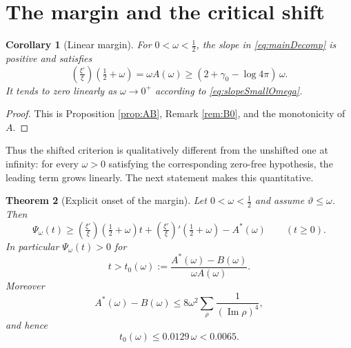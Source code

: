 \documentclass[11pt,reqno]{amsart}
\theoremstyle{plain}
\newtheorem{theorem}{Theorem}[section]
\newtheorem{corollary}[theorem]{Corollary}
\theoremstyle{definition}
\newcommand{\Ip}{\operatorname{Im}}
\newcommand{\lxi}[1]{\left(\tfrac{\xi'}{\xi}\right)\!#1}
\begin{document}
\section{The margin and the critical shift}\label{sec:margin}

\begin{corollary}[Linear margin]\label{cor:margin}
For $0<\omega<\tfrac12$, the slope in \eqref{eq:mainDecomp} is positive and satisfies
\begin{equation}\label{eq:slopeLower}
 \lxi{\left(\tfrac12+\omega\right)}
 =\omega A(\omega)
 \ge (2+\gamma_0-\log4\pi)\,\omega.
\end{equation}
It tends to zero linearly as $\omega\to0^+$ according to \eqref{eq:slopeSmallOmega}.
\end{corollary}

\begin{proof}
This is Proposition \ref{prop:AB}, Remark \ref{rem:B0}, and the monotonicity of $A$.
\end{proof}

Thus the shifted criterion is qualitatively different from the unshifted one at infinity: for every
$\omega>0$ satisfying the corresponding zero-free hypothesis, the leading term grows linearly.
The next statement makes this quantitative.

\begin{theorem}[Explicit onset of the margin]\label{thm:threshold}
Let $0<\omega<\tfrac12$ and assume $\vartheta\le\omega$.  Then
\begin{equation}\label{eq:lowerMargin}
 \Psi_\omega(t)\ge
 \lxi{\left(\tfrac12+\omega\right)}t
 +\lxi{'\left(\tfrac12+\omega\right)}-A^*(\omega)
 \qquad(t\ge0).
\end{equation}
In particular $\Psi_\omega(t)>0$ for
\begin{equation}\label{eq:t0}
 t>t_0(\omega):=
 \frac{A^*(\omega)-B(\omega)}{\omega A(\omega)}.
\end{equation}
Moreover
\begin{equation}\label{eq:AstarMinusBbound}
 A^*(\omega)-B(\omega)
 \le8\omega^2\sum_\rho\frac1{(\Ip\rho)^4},
\end{equation}
and hence
\begin{equation}\label{eq:t0numeric}
 t_0(\omega)\le0.0129\,\omega<0.0065.
\end{equation}
\end{theorem}
\end{document}
